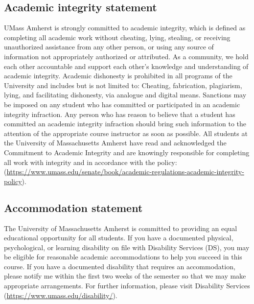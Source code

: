 \documentclass[11pt]{article}
\begin{document}
\subsection*{Academic integrity statement}
\label{sec:orgf2dc32f}
UMass Amherst is strongly committed to academic integrity, which is defined as
completing all academic work without cheating, lying, stealing, or receiving
unauthorized assistance from any other person, or using any source of
information not appropriately authorized or attributed. As a community, we hold
each other accountable and support each other’s knowledge and understanding of
academic integrity. Academic dishonesty is prohibited in all programs of the
University and includes but is not limited to: Cheating, fabrication,
plagiarism, lying, and facilitating dishonesty, via analogue and digital means.
Sanctions may be imposed on any student who has committed or participated in an
academic integrity infraction. Any person who has reason to believe that a
student has committed an academic integrity infraction should bring such
information to the attention of the appropriate course instructor as soon as
possible. All students at the University of Massachusetts Amherst have read and
acknowledged the Commitment to Academic Integrity and are knowingly responsible
for completing all work with integrity and in accordance with the policy:
(\url{https://www.umass.edu/senate/book/academic-regulations-academic-integrity-policy}).

\subsection*{Accommodation statement}
\label{sec:orgd5e488f}
The University of Massachusetts Amherst is committed to providing an equal
educational opportunity for all students. If you have a documented physical,
psychological, or learning disability on file with Disability Services (DS),
you may be eligible for reasonable academic accommodations to help you succeed
in this course. If you have a documented disability that requires an
accommodation, please notify me within the first two weeks of the semester so
that we may make appropriate arrangements. For further information, please
visit Disability Services (\url{https://www.umass.edu/disability/}).
\end{document}
